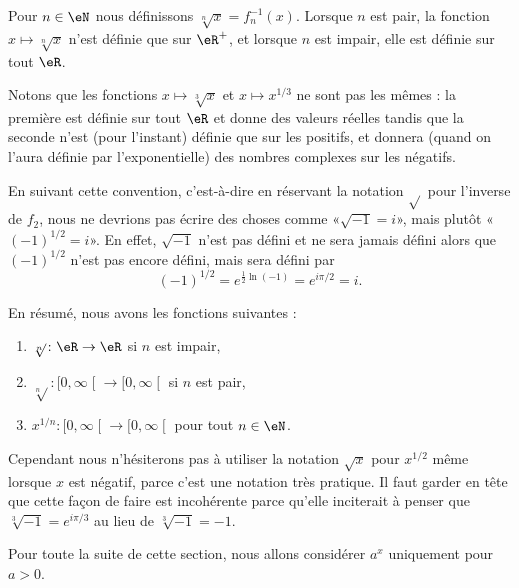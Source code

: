 \begin{definition}[Racine]     \label{DEFooPOELooPouwtD}
	Pour \( n\in \eN\) nous définissons \( \sqrt[n]{ x }=f_n^{-1}(x)\). Lorsque \( n\) est pair, la fonction \( x\mapsto\sqrt[n]{ x }\) n'est définie que sur \( \eR^+\), et lorsque \( n\) est impair, elle est définie sur tout \( \eR\).
\end{definition}

\begin{normaltext}      \label{NORMooYPRNooWCjEgR}
	Notons que les fonctions \( x\mapsto \sqrt[3]{ x }\) et \( x\mapsto x^{1/3}\) ne sont pas les mêmes : la première est définie sur tout \( \eR\) et donne des valeurs réelles tandis que la seconde n'est (pour l'instant) définie que sur les positifs, et donnera (quand on l'aura définie par l'exponentielle) des nombres complexes sur les négatifs.

	En suivant cette convention, c'est-à-dire en réservant la notation \( \sqrt{  }\) pour l'inverse de \( f_2\), nous ne devrions pas écrire des choses comme «\( \sqrt{ -1 }=i\)», mais plutôt «\( (-1)^{1/2}=i \)». En effet, \( \sqrt{ -1 }\) n'est pas défini et ne sera jamais défini alors que \( (-1)^{1/2}\) n'est pas encore défini, mais sera défini par
	\begin{equation}
		(-1)^{1/2}= e^{\frac{ 1 }{2}\ln(-1)}= e^{i\pi/2}=i.
	\end{equation}
\end{normaltext}

En résumé, nous avons les fonctions suivantes :
\begin{enumerate}
	\item
	      \( \sqrt[n]{  }\colon \eR\to \eR\) si \( n\) est impair,
	\item
	      \( \sqrt[n]{  }\colon \mathopen[ 0 , \infty \mathclose[\to \mathopen[ 0 , \infty \mathclose[ \) si \( n\) est pair,
	\item
	      \( x^{1/n}\colon \mathopen[ 0 , \infty \mathclose[\to \mathopen[ 0 , \infty \mathclose[\) pour tout \( n\in \eN\).
\end{enumerate}
Cependant nous n'hésiterons pas à utiliser la notation \( \sqrt{ x }\) pour \( x^{1/2}\) même lorsque \( x\) est négatif, parce c'est une notation très pratique. Il faut garder en tête que cette façon de faire est incohérente parce qu'elle inciterait à penser que \( \sqrt[3]{-1  }= e^{i\pi/3}\) au lieu de \( \sqrt[3]{-1  }=-1\).

Pour toute la suite de cette section, nous allons considérer \( a^x\) uniquement pour \( a>0\).

